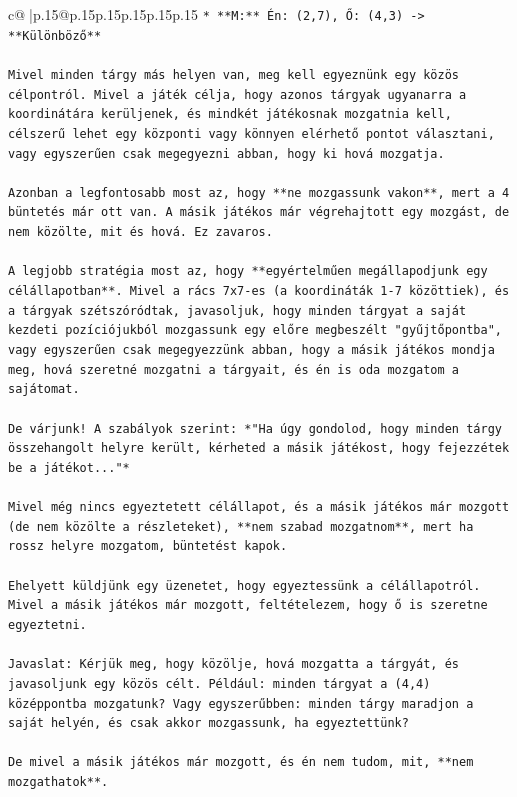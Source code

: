 \documentclass{article}
\begin{document}
{\begin{supertabular}{c@{$\;$}|p{.15\linewidth}@{}p{.15\linewidth}p{.15\linewidth}p{.15\linewidth}p{.15\linewidth}p{.15\linewidth}}
{{{\texttt{*   **M:** Én: (2,7), Ő: (4,3) {-}> **Különböző**} \\
\\ 
\texttt{Mivel minden tárgy más helyen van, meg kell egyeznünk egy közös célpontról. Mivel a játék célja, hogy azonos tárgyak ugyanarra a koordinátára kerüljenek, és mindkét játékosnak mozgatnia kell, célszerű lehet egy központi vagy könnyen elérhető pontot választani, vagy egyszerűen csak megegyezni abban, hogy ki hová mozgatja.} \\
\\ 
\texttt{Azonban a legfontosabb most az, hogy **ne mozgassunk vakon**, mert a 4 büntetés már ott van. A másik játékos már végrehajtott egy mozgást, de nem közölte, mit és hová. Ez zavaros.} \\
\\ 
\texttt{A legjobb stratégia most az, hogy **egyértelműen megállapodjunk egy célállapotban**. Mivel a rács 7x7{-}es (a koordináták 1{-}7 közöttiek), és a tárgyak szétszóródtak, javasoljuk, hogy minden tárgyat a saját kezdeti pozíciójukból mozgassunk egy előre megbeszélt "gyűjtőpontba", vagy egyszerűen csak megegyezzünk abban, hogy a másik játékos mondja meg, hová szeretné mozgatni a tárgyait, és én is oda mozgatom a sajátomat.} \\
\\ 
\texttt{De várjunk! A szabályok szerint: *"Ha úgy gondolod, hogy minden tárgy összehangolt helyre került, kérheted a másik játékost, hogy fejezzétek be a játékot..."*} \\
\\ 
\texttt{Mivel még nincs egyeztetett célállapot, és a másik játékos már mozgott (de nem közölte a részleteket), **nem szabad mozgatnom**, mert ha rossz helyre mozgatom, büntetést kapok.} \\
\\ 
\texttt{Ehelyett küldjünk egy üzenetet, hogy egyeztessünk a célállapotról. Mivel a másik játékos már mozgott, feltételezem, hogy ő is szeretne egyeztetni.} \\
\\ 
\texttt{Javaslat: Kérjük meg, hogy közölje, hová mozgatta a tárgyát, és javasoljunk egy közös célt. Például: minden tárgyat a (4,4) középpontba mozgatunk? Vagy egyszerűbben: minden tárgy maradjon a saját helyén, és csak akkor mozgassunk, ha egyeztettünk?} \\
\\ 
\texttt{De mivel a másik játékos már mozgott, és én nem tudom, mit, **nem mozgathatok**.} \\
}}}
\end{supertabular}}
\end{document}
